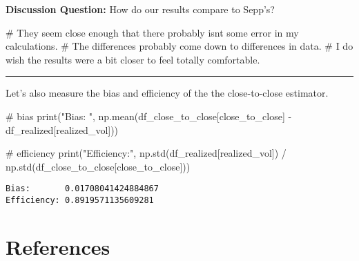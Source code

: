 \documentclass[
  letterpaper,
  DIV=11,
  numbers=noendperiod]{scrreprt}
\newenvironment{Shaded}{\begin{snugshade}}{\end{snugshade}}
\newcommand{\BuiltInTok}[1]{\textcolor[rgb]{0.00,0.23,0.31}{#1}}
\newcommand{\CommentTok}[1]{\textcolor[rgb]{0.37,0.37,0.37}{#1}}
\newcommand{\NormalTok}[1]{\textcolor[rgb]{0.00,0.23,0.31}{#1}}
\newcommand{\OperatorTok}[1]{\textcolor[rgb]{0.37,0.37,0.37}{#1}}
\newcommand{\StringTok}[1]{\textcolor[rgb]{0.13,0.47,0.30}{#1}}
\newlength{\cslhangindent}
\newlength{\cslentryspacingunit} %
\newenvironment{CSLReferences}[2] %
 {%
  \setlength{\parindent}{0pt}
  \ifodd #1
  \let\oldpar\par
  \def\par{\hangindent=\cslhangindent\oldpar}
  \fi
  \setlength{\parskip}{#2\cslentryspacingunit}
 }%
 {}
\begin{document}
\textbf{Discussion Question:} How do our results compare to Sepp's?

\begin{Shaded}
\begin{Highlighting}[]
\CommentTok{\# They seem close enough that there probably isn\textquotesingle{}t some error in my calculations.}
\CommentTok{\# The differences probably come down to differences in data.}
\CommentTok{\# I do wish the results were a bit closer to feel totally comfortable.}
\end{Highlighting}
\end{Shaded}

\begin{center}\rule{0.5\linewidth}{0.5pt}\end{center}

Let's also measure the bias and efficiency of the the close-to-close
estimator.

\begin{Shaded}
\begin{Highlighting}[]
\CommentTok{\# bias}
\BuiltInTok{print}\NormalTok{(}\StringTok{"Bias:      "}\NormalTok{, np.mean(df\_close\_to\_close[}\StringTok{\textquotesingle{}close\_to\_close\textquotesingle{}}\NormalTok{] }\OperatorTok{{-}}\NormalTok{ df\_realized[}\StringTok{\textquotesingle{}realized\_vol\textquotesingle{}}\NormalTok{]))}

\CommentTok{\# efficiency}
\BuiltInTok{print}\NormalTok{(}\StringTok{"Efficiency:"}\NormalTok{, np.std(df\_realized[}\StringTok{\textquotesingle{}realized\_vol\textquotesingle{}}\NormalTok{]) }\OperatorTok{/}\NormalTok{ np.std(df\_close\_to\_close[}\StringTok{\textquotesingle{}close\_to\_close\textquotesingle{}}\NormalTok{]))}
\end{Highlighting}
\end{Shaded}

\begin{verbatim}
Bias:       0.01708041424884867
Efficiency: 0.8919571135609281
\end{verbatim}


\hypertarget{references}{%
\chapter*{References}\label{references}}


\hypertarget{refs}{}
\begin{CSLReferences}{0}{0}
\end{CSLReferences}
\end{document}
